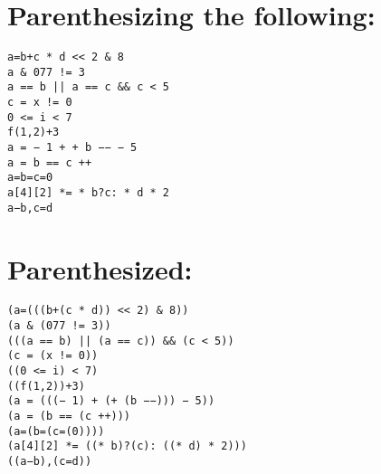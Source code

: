 \documentclass{article}
\begin{document}
 \section*{Parenthesizing the following:}
      \texttt{a=b+c * d << 2 \& 8}\\
      \texttt{a \& 077 != 3}\\
      \texttt{a == b || a == c \&\& c < 5}\\
      \texttt{c = x != 0}\\
      \texttt{0 <= i < 7}\\
      \texttt{f(1,2)+3}\\
      \texttt{a = − 1 + + b −− − 5}\\
      \texttt{a = b == c ++}\\
      \texttt{a=b=c=0}\\
      \texttt{a[4][2] *= * b?c: * d * 2}\\
      \texttt{a−b,c=d}\\
      
 \section*{Parenthesized:}
      \texttt{(a=(((b+(c * d)) << 2) \& 8))}\\
      \texttt{(a \& (077 != 3))}\\
      \texttt{(((a == b) || (a == c)) \&\& (c < 5))}\\
      \texttt{(c = (x != 0))}\\
      \texttt{((0 <= i) < 7)}\\
      \texttt{((f(1,2))+3)}\\
      \texttt{(a = (((− 1) + (+ (b −−))) − 5))}\\
      \texttt{(a = (b == (c ++)))}\\
      \texttt{(a=(b=(c=(0))))}\\
      \texttt{(a[4][2] *= ((* b)?(c): ((* d) * 2)))}\\
      \texttt{((a−b),(c=d))}\\
\end{document}
